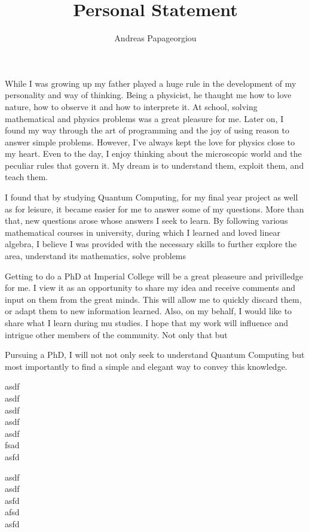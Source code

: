 \documentclass[a4paper,10pt]{article}
\title{Personal Statement}
\author{Andreas Papageorgiou}
\date{}
\begin{document}
\maketitle
\thispagestyle{empty}
While I was growing up my father played a huge rule in the development of my personality and way of thinking.
Being a physicist, he thaught me how to love nature, how to observe it and how to interprete it.
At school, solving mathematical and physics problems was a great pleasure for me.
Later on, I found my way through the art of programming and the joy of using reason to answer simple problems.
However, I've always kept the love for physics close to my heart. Even to the day, I enjoy thinking about the microscopic world and the peculiar rules that govern it.
My dream is to understand them, exploit them, and teach them. 

I found that by studying Quantum Computing, for my final year project as well as for leisure, it became easier for me to
answer some of my questions. More than that, new questions arose whose answers I seek to learn.
By following various mathematical courses in university, during which I learned and loved linear algebra, I believe I was provided with the necessary skills
to further explore the area, understand its mathematics, solve problems 


Getting to do a PhD at Imperial College will be a great pleaseure and privilledge for me. I view it as an opportunity to share my idea and receive
comments and input on them from the great minds. This will allow me to quickly discard them, or adapt them to new information learned. Also, on my behalf,
I would like to share what I learn during mu studies. I hope that my work will influence and intrigue other members of the community. Not only that
but 


Pursuing a PhD, I will not not only seek to understand Quantum Computing but most importantly to find a simple and elegant way to convey this knowledge.


asdf\\
asdf\\
asdf\\
asdf\\
asdf\\
fsad\\
asfd

asdf\\
asdf\\
asfd\\
afsd\\
asfd\\
\end{document}
